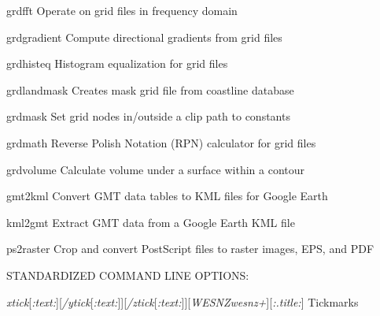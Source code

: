 \documentclass{article}
\begin{document}
\par 	grdfft	Operate on grid files in frequency domain\par 

\par 	grdgradient	Compute directional gradients from grid files\par 

\par 	grdhisteq	Histogram equalization for grid files\par 

\par 	grdlandmask	Creates mask grid file from coastline database\par 

\par 	grdmask	Set grid nodes in/outside a clip path to constants\par 

\par 	grdmath	Reverse Polish Notation (RPN) calculator for grid files\par 

\par 	grdvolume	Calculate volume under a surface within a contour\par 

\par \par 

\par	 gmt2kml	Convert GMT data tables to KML files for Google Earth\par

\par	 kml2gmt	Extract GMT data from a Google Earth KML file\par

\par	 ps2raster	Crop and convert PostScript files to raster images, EPS, and PDF\par

\par \par 

\par STANDARDIZED COMMAND LINE OPTIONS:\par 

\par {}\emph{xtick}[\emph{:text:}][\emph{/ytick}[\emph{:text:}]][\emph{/ztick}[\emph{:text:}]][\emph{WESNZwesnz+}][\emph{:.title:}]	Tickmarks\par 
\end{document}
